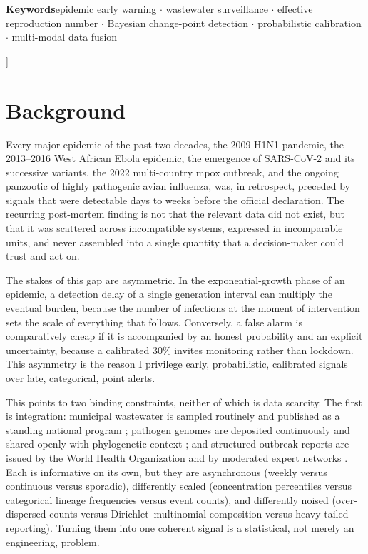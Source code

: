 \documentclass[10pt,twocolumn]{article}
\theoremstyle{definition}
\begin{document}
{\begin{center}\begin{minipage}{0.86\textwidth}\small
\textbf{Keywords}\quad epidemic early warning $\cdot$ wastewater surveillance
$\cdot$ effective reproduction number $\cdot$ Bayesian change-point detection
$\cdot$ probabilistic calibration $\cdot$ multi-modal data fusion
\end{minipage}\end{center}
\vspace{18pt}
}]

\section{Background}
\label{sec:intro}

Every major epidemic of the past two decades, the 2009 H1N1 pandemic, the
2013--2016 West African Ebola epidemic, the emergence of SARS-CoV-2 and its
successive variants, the 2022 multi-country mpox outbreak, and the ongoing
panzootic of highly pathogenic avian influenza, was, in retrospect, preceded by
signals that were detectable days to weeks before the official declaration. The
recurring post-mortem finding is not that the relevant data did not exist, but
that it was scattered across incompatible systems, expressed in incomparable
units, and never assembled into a single quantity that a decision-maker could
trust and act on.

The stakes of this gap are asymmetric. In the exponential-growth phase of an
epidemic, a detection delay of a single generation interval can multiply the
eventual burden, because the number of infections at the moment of intervention
sets the scale of everything that follows. Conversely, a false alarm is
comparatively cheap if it is accompanied by an honest probability and an explicit
uncertainty, because a calibrated $30\%$ invites monitoring rather than
lockdown. This asymmetry is the reason I privilege early, probabilistic,
calibrated signals over late, categorical, point alerts.

This points to two binding constraints, neither of which is data scarcity.
The first is integration: municipal wastewater is sampled routinely and
published as a standing national program \citep{nwss,naughton2023}; pathogen
genomes are deposited continuously and shared openly with phylogenetic context
\citep{hadfield2018}; and structured outbreak reports are issued by the World
Health Organization and by moderated expert networks
\citep{promed,carlson2023}. Each is informative on its own, but they are
asynchronous (weekly versus continuous versus sporadic), differently scaled
(concentration percentiles versus categorical lineage frequencies versus event
counts), and differently noised (over-dispersed counts versus
Dirichlet--multinomial composition versus heavy-tailed reporting). Turning them
into one coherent signal is a statistical, not merely an engineering, problem.
\end{document}
